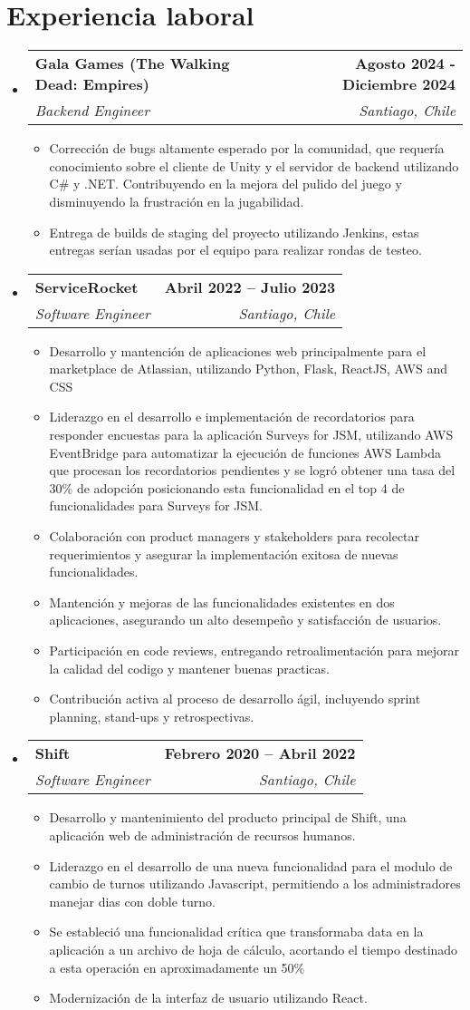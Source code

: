 \documentclass[letterpaper,11pt]{article}
\makeatletter
\newcommand{\resumeItem}[1]{
  \item\small{
    {#1 \vspace{-2pt}}
  }
}
\newcommand{\resumeSubheading}[4]{
  \vspace{-2pt}\item
    \begin{tabular*}{1.0\textwidth}[t]{l@{\extracolsep{\fill}}r}
      \textbf{#1} & \textbf{\small #2} \\
      \textit{\small#3} & \textit{\small #4} \\
    \end{tabular*}\vspace{-7pt}
}
\newcommand{\resumeSubHeadingListStart}{\begin{itemize}[leftmargin=0.0in, label={}]}
\newcommand{\resumeSubHeadingListEnd}{\end{itemize}}
\newcommand{\resumeItemListStart}{\begin{itemize}}
\newcommand{\resumeItemListEnd}{\end{itemize}\vspace{-5pt}}
\makeatother
\begin{document}
\section{Experiencia laboral}
  \resumeSubHeadingListStart
    \resumeSubheading
      {Gala Games (The Walking Dead: Empires)}{Agosto 2024 - Diciembre 2024}
      {Backend Engineer}{Santiago, Chile}
      \resumeItemListStart
        \resumeItem{Corrección de bugs altamente esperado por la comunidad, que requería conocimiento sobre el cliente de Unity y 
        el servidor de backend utilizando C\# y .NET. Contribuyendo en la mejora del pulido del juego y disminuyendo la frustración en la jugabilidad.}
        \resumeItem{Entrega de builds de staging del proyecto utilizando Jenkins, estas entregas serían usadas por el equipo para 
        realizar rondas de testeo.}
      \resumeItemListEnd
    \resumeSubheading
      {ServiceRocket}{Abril 2022 -- Julio 2023}
      {Software Engineer}{Santiago, Chile}
      \resumeItemListStart
        \resumeItem{Desarrollo y mantención de aplicaciones web principalmente para el marketplace de Atlassian, utilizando Python, Flask, ReactJS, AWS and CSS}
        \resumeItem{Liderazgo en el desarrollo e implementación de recordatorios para responder
        encuestas para la aplicación Surveys for JSM, utilizando AWS EventBridge para automatizar
        la ejecución de funciones AWS Lambda que procesan los recordatorios pendientes y se logró
        obtener una tasa del 30\% de adopción posicionando esta funcionalidad en el top 4 de
        funcionalidades para Surveys for JSM.}
        \resumeItem{Colaboración con product managers y stakeholders para recolectar requerimientos y asegurar la implementación exitosa de nuevas funcionalidades.}
        \resumeItem{Mantención y mejoras de las funcionalidades existentes en dos aplicaciones, asegurando un alto desempeño y satisfacción de usuarios.}
        \resumeItem{Participación en code reviews, entregando retroalimentación para mejorar la calidad del codigo y mantener buenas practicas.}
        \resumeItem{Contribución activa al proceso de desarrollo ágil, incluyendo sprint planning, stand-ups y retrospectivas.}
      \resumeItemListEnd
    \resumeSubheading
      {Shift}{Febrero 2020 -- Abril 2022}
      {Software Engineer}{Santiago, Chile}
      \resumeItemListStart
        \resumeItem{Desarrollo y mantenimiento del producto principal de Shift, una aplicación web de administración de recursos humanos.}
        \resumeItem{Liderazgo en el desarrollo de una nueva funcionalidad para el modulo de cambio de turnos utilizando Javascript, permitiendo a los administradores manejar dias con doble turno.}
        \resumeItem{Se estableció una funcionalidad crítica que transformaba data en la aplicación
        a un archivo de hoja de cálculo, acortando el tiempo destinado a esta operación en 
        aproximadamente un 50\%}
        \resumeItem{Modernización de la interfaz de usuario utilizando React.}
      \resumeItemListEnd  
  \resumeSubHeadingListEnd
\vspace{-16pt}
\end{document}
